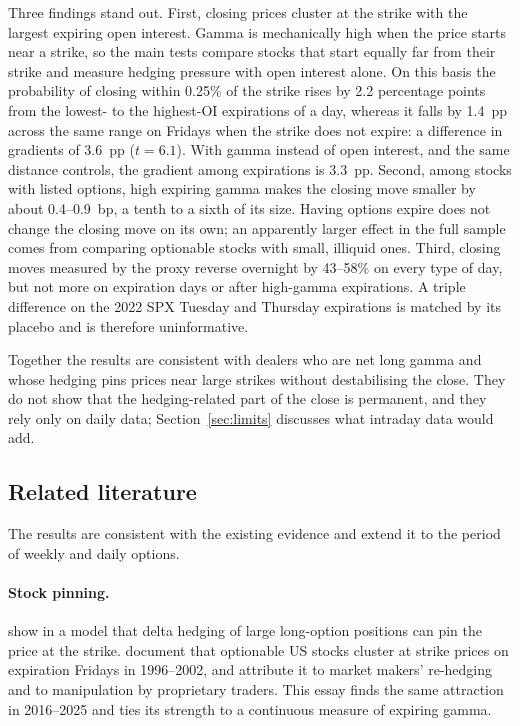 \documentclass[11pt,a4paper]{article}
\begin{document}
Three findings stand out. First, closing prices cluster at the strike with the largest expiring open interest. Gamma is mechanically high when the price starts near a strike, so the main tests compare stocks that start equally far from their strike and measure hedging pressure with open interest alone. On this basis the probability of closing within 0.25\% of the strike rises by 2.2 percentage points from the lowest- to the highest-OI expirations of a day, whereas it falls by 1.4~pp across the same range on Fridays when the strike does not expire: a difference in gradients of 3.6~pp ($t=6.1$). With gamma instead of open interest, and the same distance controls, the gradient among expirations is 3.3~pp. Second, among stocks with listed options, high expiring gamma makes the closing move smaller by about 0.4--0.9~bp, a tenth to a sixth of its size. Having options expire does not change the closing move on its own; an apparently larger effect in the full sample comes from comparing optionable stocks with small, illiquid ones. Third, closing moves measured by the proxy reverse overnight by 43--58\% on every type of day, but not more on expiration days or after high-gamma expirations. A triple difference on the 2022 SPX Tuesday and Thursday expirations is matched by its placebo and is therefore uninformative.

Together the results are consistent with dealers who are net long gamma and whose hedging pins prices near large strikes without destabilising the close. They do not show that the hedging-related part of the close is permanent, and they rely only on daily data; Section~\ref{sec:limits} discusses what intraday data would add.

\subsection*{Related literature}

The results are consistent with the existing evidence and extend it to the period of weekly and daily options.

\paragraph{Stock pinning.} \citet{AvellanedaLipkin2003} show in a model that delta hedging of large long-option positions can pin the price at the strike. \citet{NiPearsonPoteshman2005} document that optionable US stocks cluster at strike prices on expiration Fridays in 1996--2002, and attribute it to market makers' re-hedging and to manipulation by proprietary traders. This essay finds the same attraction in 2016--2025 and ties its strength to a continuous measure of expiring gamma.
\end{document}
